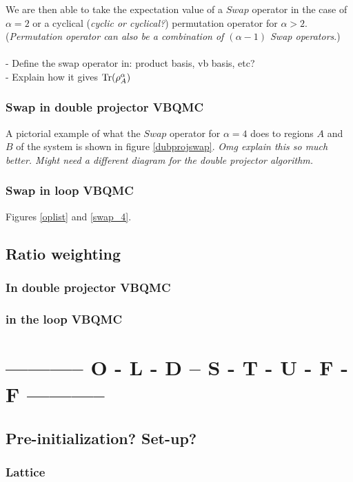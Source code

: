 \documentclass[prb,aps,twocolumn,floatfix,amsmath,amssymb,superscriptaddress,tightenlines]{revtex4}
\begin{document}
We are then able to take the expectation value of a $Swap$ operator in the case of $\alpha = 2$ or a cyclical ({\it cyclic or cyclical?}) permutation operator for $\alpha > 2$. 
({\it Permutation operator can also be a combination of $(\alpha - 1)$ Swap operators}.)
\\\\
- Define the swap operator in: product basis, vb basis, etc?\\
- Explain how it gives ${\rm Tr} (\rho_A^{\alpha})$

\subsubsection{Swap in double projector VBQMC}
A pictorial example of what the $Swap$ operator for $\alpha = 4$ does to regions $A$ and $B$ of the system is shown in figure \ref{dubprojswap}. {\it Omg explain this so much better.  Might need a different diagram for the double projector algorithm.}

\subsubsection{Swap in  loop VBQMC}
Figures \ref{oplist} and \ref{swap_4}.

\subsection{Ratio weighting}

\subsubsection{In double projector VBQMC}
\subsubsection{in the loop VBQMC}

\section{----------- O - L - D -- S - T - U - F - F -----------}
\subsection{Pre-initialization? Set-up? }
 
\subsubsection{Lattice}
	
\end{document}
